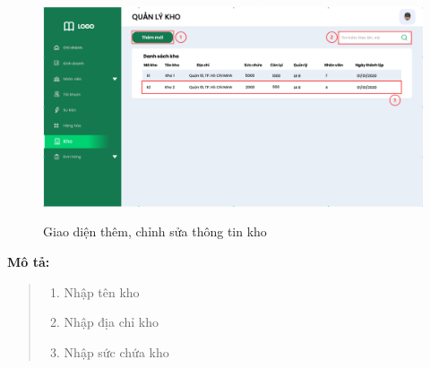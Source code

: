             \begin{figure}[!htp]
                \centering
                \includegraphics[width=12cm]{img/UI/admin/warehouse.png}
                \label{33}
                \newline
                \caption{Giao diện thêm, chỉnh sửa thông tin kho}
            \end{figure}
            \textbf{Mô tả:}  
            \begin{quote}
                \begin{enumerate}
                    \item Nhập tên kho
                    \item Nhập địa chỉ kho
                    \item Nhập sức chứa kho
                \end{enumerate}
            \end{quote}
    
    \newpage



